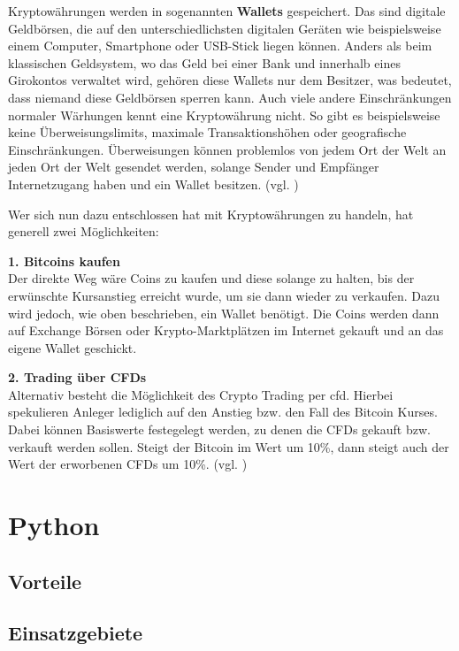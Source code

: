 \documentclass[oneside]{ausarbeitung}
\begin{document}
Kryptowährungen werden in sogenannten \textbf{Wallets} gespeichert. Das sind digitale Geldbörsen, die auf den unterschiedlichsten digitalen Geräten wie beispielsweise einem Computer, Smartphone oder USB-Stick liegen können. Anders als beim klassischen Geldsystem, wo das Geld bei einer Bank und innerhalb eines Girokontos verwaltet wird, gehören diese Wallets nur dem Besitzer, was bedeutet, dass niemand diese Geldbörsen sperren kann. Auch viele andere Einschränkungen normaler Wärhungen kennt eine Kryptowährung nicht. So gibt es beispielsweise keine Überweisungslimits, maximale Transaktionshöhen oder geografische Einschränkungen. Überweisungen können problemlos von jedem Ort der Welt an jeden Ort der Welt gesendet werden, solange Sender und Empfänger Internetzugang haben und ein Wallet besitzen. (vgl. \cite{bitcoins_erklärung})

Wer sich nun dazu entschlossen hat mit Kryptowährungen zu handeln, hat generell zwei Möglichkeiten:

\textbf{1. Bitcoins kaufen} \\
Der direkte Weg wäre Coins zu kaufen und diese solange zu halten, bis der erwünschte Kursanstieg erreicht wurde, um sie dann wieder zu verkaufen. Dazu wird jedoch, wie oben beschrieben, ein Wallet benötigt. Die Coins werden dann auf Exchange Börsen oder Krypto-Marktplätzen im Internet gekauft und an das eigene Wallet geschickt. 

\textbf{2. Trading über CFDs} \\
Alternativ besteht die Möglichkeit des Crypto Trading per \ac{cfd}. Hierbei spekulieren Anleger lediglich auf den Anstieg bzw. den Fall des Bitcoin Kurses. Dabei können Basiswerte festegelegt werden, zu denen die CFDs gekauft bzw. verkauft werden sollen. Steigt der Bitcoin im Wert um 10\%, dann steigt auch der Wert der erworbenen CFDs um 10\%. (vgl. \cite{crypto_trading})


\section{Python}
\label{sec:python}

\subsection{Vorteile}
\label{sub:vorteile}

\subsection{Einsatzgebiete}
\label{sub:einsatzgebiete}
\end{document}
